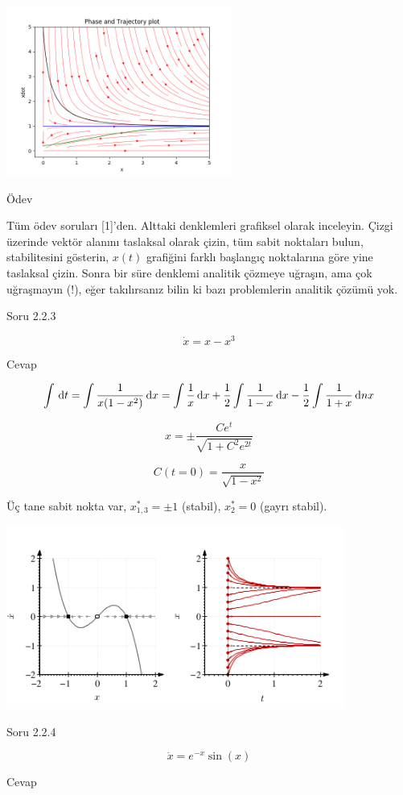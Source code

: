 \documentclass[12pt,fleqn]{article}\usepackage{../../common}
\begin{document}
\includegraphics[width=20em]{03_16.png}


Ödev

Tüm ödev soruları [1]'den. Alttaki denklemleri grafiksel olarak
inceleyin. Çizgi üzerinde vektör alanını taslaksal olarak çizin, tüm sabit
noktaları bulun, stabilitesini gösterin, $x(t)$ grafiğini farklı başlangıç
noktalarına göre yine taslaksal çizin. Sonra bir süre denklemi analitik çözmeye
uğraşın, ama çok uğraşmayın (!), eğer takılırsanız bilin ki bazı problemlerin
analitik çözümü yok.

Soru 2.2.3

$$ \dot{x} = x - x^3 $$

Cevap

$$
\int \,\mathrm{d} t = \int \frac{1}{x(1-x^2)} \,\mathrm{d} x =
\int \frac{1}{x} \,\mathrm{d} x +
\frac{1}{2} \int \frac{1}{1-x} \,\mathrm{d} x -
\frac{1}{2} \int \frac{1}{1+x} \,\mathrm{d} nx
$$

$$ x = \pm \frac{Ce^t}{\sqrt{1 + C^2e^{2t}} } $$

$$ C(t=0) = \frac{x}{\sqrt{1-x^2}} $$

Üç tane sabit nokta var, $x^*_{1,3} = \pm 1$ (stabil), $x^*_2 = 0$ (gayrı
stabil). 

\includegraphics[height=6cm]{03_09.png}

Soru 2.2.4

$$ \dot{x} = e^{-x}\sin(x) $$

Cevap
\end{document}
